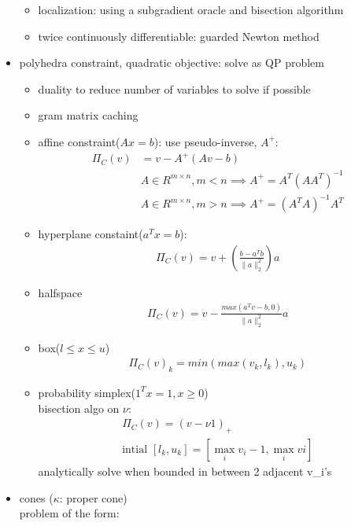 \documentclass[8pt,letter]{article}
\begin{document}
\begin{multicols*}{2}
\begin{itemize}
\begin{itemize}
    \item localization: using a subgradient oracle and bisection algorithm
    \item twice continuously differentiable: guarded Newton method
    \end{itemize}
  \item polyhedra constraint, quadratic objective: solve as QP problem
    \begin{itemize}
    \item duality to reduce number of variables to solve if possible
    \item gram matrix caching
    \item affine constraint($Ax=b$): use pseudo-inverse, $A^{+}$:
      \begin{align*}
        \Pi_C(v) &= v - A^{+}(Av-b)\\
                 &A \in R^{m \times n}, m < n \implies A^{+} = A^T(AA^T)^{-1}\\
                 &A \in R^{m \times n}, m > n \implies A^{+} = (A^TA)^{-1}A^T
      \end{align*}
    \item hyperplane constaint($a^Tx=b$):
      \begin{align*}
        \Pi_C(v) = v + (\frac{b-a^Tb}{\|a\|_2^2})a
      \end{align*}
    \item halfspace
      \begin{align*}
        \Pi_C(v) = v - \frac{max(a^T v -b,0)}{\|a\|_2^2}a
      \end{align*}
    \item box($l\leq x \leq u$)
      \begin{align*}
        \Pi_C(v)_k = min(max(v_k, l_k), u_k)
      \end{align*}
    \item probability simplex($1^Tx= 1, x \geq 0$)\\
      bisection algo on $\nu$:
      \begin{align*}
        \Pi_C(v) = (v- \nu 1)_+\\
        \text{intial }[l_k,u_k] = [\max_i v_i-1, \max_i vi]
      \end{align*}
      analytically solve when bounded in between 2 adjacent v_i's      
    \end{itemize}
  \item cones ($\kappa$: proper cone)\\
    problem of the form:
    \begin{align*}

\end{align*}
\end{itemize}
\end{multicols*}
\end{document}
